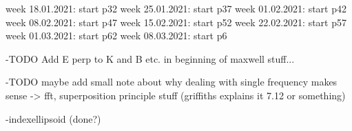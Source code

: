 week 18.01.2021: start p32
week 25.01.2021: start p37
week 01.02.2021: start p42
week 08.02.2021: start p47
week 15.02.2021: start p52
week 22.02.2021: start p57
week 01.03.2021: start p62
week 08.03.2021: start p6

-TODO Add E perp to K and B etc. in beginning of maxwell stuff...

-TODO maybe add small note about why dealing with single frequency makes sense -> fft, superposition principle stuff (griffiths explains it 7.12 or something)

-indexellipsoid (done?)